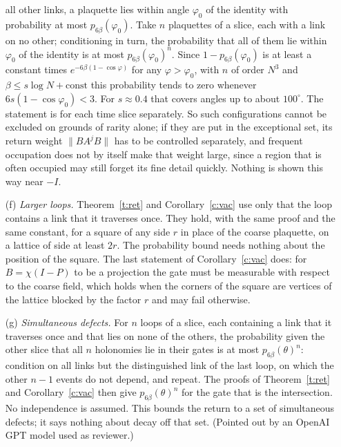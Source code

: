 \begin{remark}
\begin{enumerate}
all other links, a plaquette lies within angle $\varphi_0$ of the identity with probability at most
$p_{6\beta}(\varphi_0)$. Take $n$ plaquettes of a slice, each with a link on no other; conditioning in turn,
the probability that all of them lie within $\varphi_0$ of the identity is at most $p_{6\beta}(\varphi_0)^n$.
Since $1-p_{6\beta}(\varphi_0)$ is at least a constant times $e^{-6\beta(1-\cos\varphi)}$ for any
$\varphi>\varphi_0$, with $n$ of order $N^3$ and $\beta\le s\log N+\text{const}$ this probability tends to zero
whenever $6s(1-\cos\varphi_0)<3$. For $s\approx0.4$ that covers angles up to about $100^\circ$. The statement is
for each time slice separately. So such configurations cannot be excluded on grounds of rarity alone; if they
are put in the exceptional set, its return weight $\|BA^jB\|$ has to be controlled separately, and frequent
occupation does not by itself make that weight large, since a region that is often occupied may still forget
its fine detail quickly. Nothing is shown this way near $-I$.
\item[(f)] \emph{Larger loops.} Theorem~\ref{t:ret} and Corollary~\ref{c:vac} use only that the loop contains a link that it
traverses once. They hold, with the same proof and the same constant, for a square of any side $r$ in place of
the coarse plaquette, on a lattice of side at least $2r$. The probability bound needs nothing about the
position of the square. The last statement of Corollary~\ref{c:vac} does: for $B=\chi(I-P)$ to be a
projection the gate must be measurable with respect to the coarse field, which holds when the corners of the
square are vertices of the lattice blocked by the factor $r$ and may fail otherwise.
\item[(g)] \emph{Simultaneous defects.} For $n$ loops of a slice, each containing a link that it traverses once and that lies on none of
the others, the probability given the other slice that all $n$ holonomies lie in their gates is at most
$p_{6\beta}(\theta)^n$: condition on all links but the distinguished link of the last loop, on which the
other $n-1$ events do not depend, and repeat. The proofs of Theorem~\ref{t:ret} and Corollary~\ref{c:vac}
then give $p_{6\beta}(\theta)^n$ for the gate that is the intersection. No independence is assumed. This
bounds the return to a set of simultaneous defects; it says nothing about decay off that set. (Pointed out
by an OpenAI GPT model used as reviewer.)
\end{enumerate}
\end{remark}

